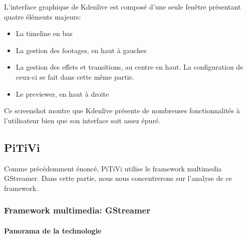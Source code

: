 L'interface graphique de Kdenlive est composé d'une seule fenêtre
présentant quatre éléments majeurs:

\begin{itemize}

  \item {La timeline en bas}

  \item {La gestion des footages, en haut à gauches}

  \item {La gestion des effets et transitions, au centre en haut. La
  configuration de ceux-ci se fait dans cette même partie.}

  \item {Le previewer, en haut à droite}

\end{itemize}


Ce screenshot montre que Kdenlive présente de nombreuses fonctionnalités
à l'utilisateur bien que son interface soit assez épuré.

\subsection {PiTiVi}

Comme précédemment énoncé, PiTiVi utilise le framework multimedia
GStreamer. Dans cette partie, nous nous concentrerons sur l'analyse de
ce framework.

\subsubsection {Framework multimedia: GStreamer}

\paragraph {Panorama de la technologie} \subparagraph{}

